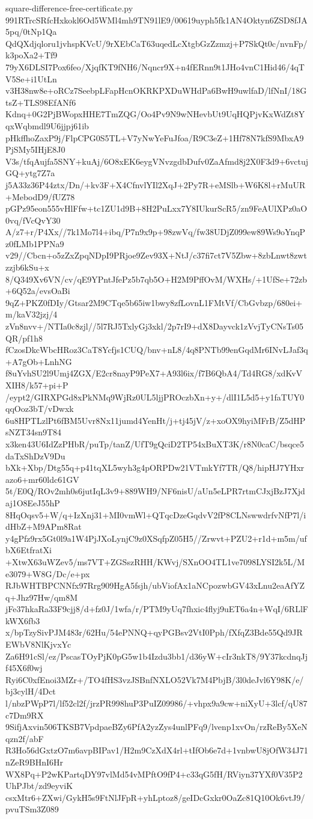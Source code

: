 \documentclass[11pt]{article}
\theoremstyle{definition}
\theoremstyle{remark}
\begin{document}
\begin{filecontents*}[overwrite]{square-difference-free-certificate.py}
991RTrcSRfcHxkokl6Od5WMl4mh9TN91lE9/00619uyph5fk1AN4Oktyn6ZSD8fJA5pq/0tNp1Qa
QdQXdjqloru1jvhspKVcU/9rXEbCaT63uqedLcXtgbGzZzmzj+P7SkQt0c/nvnFp/k3poXa2+Tf9
79yX6DLSI7Pox6feo/XjqfKT9fNH6/Nqncr9X+n4fERnn9t1JHo4vnC1Hid46/4qTV5Se+i1UtLn
v3H38nw8e+oRCz7SeebpLFapHcnOKRKPXDuWHdPa6BwH9uwlfaD/lfNnI/18GtsZ+TLS98EfANf6
Kdnq+0G2PjBWopxHHE7TmZQG/Oo4Pv9N9wNHevbUt9UqHQPjvKxWdZt8YqxWqbmdl9U6jjpj61ib
pHkffhoZaxP9j/FlpCPG0S5TL+V7yNwYeFuJfoa/R9C3eZ+1Hf78N7kfS9MbxA9PjSMy5IHjE8J0
V3s/tfqAujfa5SNY+kuAj/6O8xEK6eygVNvzgdbDufv0ZaAfmd8j2X0F3d9+6vctujGQ+ytg7Z7a
j5A33z36P44ztx/Dn/+kv3F+X4CfnvlYIl2XqJ+2Py7R+eMSlb+W6K8l+rMuUR+MebodD9/fUZ78
pGPz95eon555vHlFfw+tc1ZU1d9B+8H2PuLxx7Y8IUkurScR5/zn9FeAUlXPz0aO0vq/fVcQvY30
A/z7+r/P4Xx//7k1Mo7l4+ibq/P7n9x9p+98zwVq/fw38UDjZ099ew89Ws9oYnqPz0fLMb1PPNa9
v29//Cbcn+o5zZxZpqNDpI9PRjoe9Zev93X+NtJ/c37fi7ct7V5Zbw+8zbLnwt8zwtzzjb6kSu+x
8/Q349Xv6VN/cv/qE9YPntJfePz5b7qb5O+H2M9PffOvM/WXHs/+1UfSe+72zb+6Q52a/evsOaBi
9qZ+PKZ0fDIy/Gtsar2M9CTqe5b65iw1bwy8zfLovnL1FMtVf/CbGvbzp/680ei+m/kaV32jzj/4
zVn8nvv+/NTIa0c8zjl//5l7RJ5TxlyGj3xkl/2p7rI9+dX8Dayvck1zVvjTyCNsTs05QR/pf1h8
fCzosDkcWbcHRoz3CaT8Ycfjs1CUQ/bnv+nL8/4q8PNTb99enGqdMr6INvLJaf3q+A7gOb+LnhNG
f8uYvhSU2l9Umj4ZGX/E2cr8nayP9PeX7+A93l6ix/f7B6QbA4/Td4RG8/xdKvVXIH8/k57+pi+P
/eypt2/GIRXPGd8xPkNMq9WjRz0UL5ljjPROczbXn+y+/dlI1L5d5+y1faTUY0qqOoz3bT/vDwxk
6u8HPTLzlPt6fBM5Uvr8Nx11jumd4YenHt/j+tj45jV/z+xoOX9hyiMFrB/Z5dHPsNZT34sn9T84
x3ken43U6IdZzPHbR/puTp/tanZ/UfT9gQciD2TP54xBuXT3K/r8N0caC/bsqce5daTxShDzV9Du
bXk+Xbp/Dtg55q+p41tqXL5wyh3g4pORPDw21VTmkYf7TR/Q8/hipHJ7YHxrazo6+mr60ldc61GV
5t/E0Q/ROv2mh0s6jutIqL3v9+889WH9/NF6nisU/aUn5eLPR7rtmCJxjBzJ7Xjdaj1O8EeJ55hP
8HqOqsv5+W/q+IzXnj31+MI0vmWl+QTqcDzeGqdvV2fP8CLNswwdrfvNfP7l/idHbZ+M9APm8Rat
y4gPfz9rx5Gt0l9a1W4PjJXoLynjC9z0XSqfpZ05H5//Zrwvt+PZU2+r1d+m5m/ufbX6EtfratXi
+XtwX63uWZev5/ms7VT+ZGSszRHH/KWvj/SXnOO4TL1ve7098LYSI2k5L/Me3079+W8G/Dc/e+px
RJbWHTBPCNNfx97Rrg909HgA5fsjh/ubViofAx1aNCpozwbGV43xLnu2eaAfYZq+Jhz97Hw/qm8M
jFe37hkaRa33F9cjj8/d+fz0J/1wfa/r/PTM9yUq7fhxic4flyj9uET6a4n+WqI/6RLlFkWX6fb3
x/bpTzySivPJM483r/62Hu/54ePNNQ+qyPGBsv2VtI0Pph/fXfqZ3Bde55Qd9JREWbV8NlKjvxYc
Za6H91cSl/ez/PscasTOyPjK0pG5w1b4Izdu3bb1/d36yW+cIr3nkT8/9Y37kcdnqJjf45X6f0wj
Ryi6C0xfEnoi3MZr+/TO4fHS3vzJSBnfNXLO52Vk7M4PbjB/3l0deJvl6Y98K/e/bj3cylH/4Dct
l/nbzPWpP7l/lf52cl2f/jrzPR998huP3PuIZ09986/+vhpx9a9cw+niXyU+3lcf/qU87c7Dm9RX
9SifjAxvin506TKSB7VpdpaeBZy6PfA2yzZys4unlPFq9/lvenp1xvOn/rzReBy5XeNqzn2f/abF
R3Ho56dGxtzO7m6avpBIPav1/H2m9CzXdX4rl+tIfOb6e7d+1vnbwU8jOfW34J71nZeR9BHnI6Hr
WX8Pq+P2wKPartqDY97vlMd54vMPftO9fP4+c33qG5fH/RViyn37YXf0V35P2UhPJbt/zd9eyviK
csxMtr6+ZXwi/GykH5s9FtNlJFpR+yhLptoz8/geIDcGxkr0OaZc81Q10Ok6vtJ9/pvuTSm3Z089

\end{filecontents*}
\end{document}
